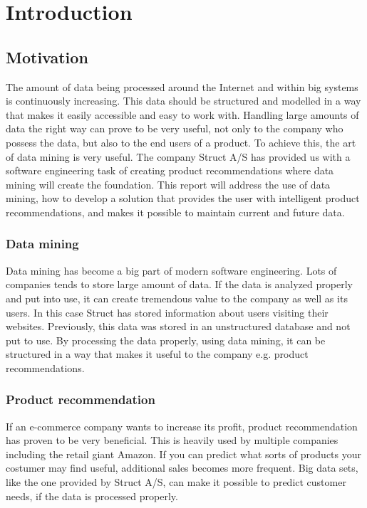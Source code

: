 
\chapter{Introduction} %

\label{ChapterX} %


\section{Motivation}
The amount of data being processed around the Internet and within big systems is continuously increasing. This data should be structured and modelled in a way that makes it easily accessible and easy to work with. Handling large amounts of data the right way can prove to be very useful, not only to the company who possess the data, but also to the end users of a product. To achieve this, the art of data mining is very useful.
The company Struct A/S \cite{Struct} has provided us with a software engineering task of creating product recommendations where data mining will create the foundation. This report will address the use of data mining, how to develop a solution that provides the user with intelligent product recommendations, and makes it possible to maintain current and future data. \cite{MongoSQL}

\subsection{Data mining}
Data mining has become a big part of modern software engineering. Lots of companies tends to store large amount of data. If the data is analyzed properly and put into use, it can create tremendous value to the company as well as its users. In this case Struct has stored information about users visiting their websites. Previously, this data was stored in an unstructured database and	 not put to use. By processing the data properly, using data mining, it can be structured in a way that makes it useful to the company e.g. product recommendations.

\color{black}
\subsection{Product recommendation}
If an e-commerce company wants to increase its profit, product recommendation has proven to be very beneficial.\cite{BigCommerce} This is heavily used by multiple companies including the retail giant Amazon.\cite{Fortune} If you can predict what sorts of products your costumer may find useful, additional sales becomes more frequent. Big data sets, like the one provided by Struct A/S, can make it possible to predict customer needs, if the data is processed properly.